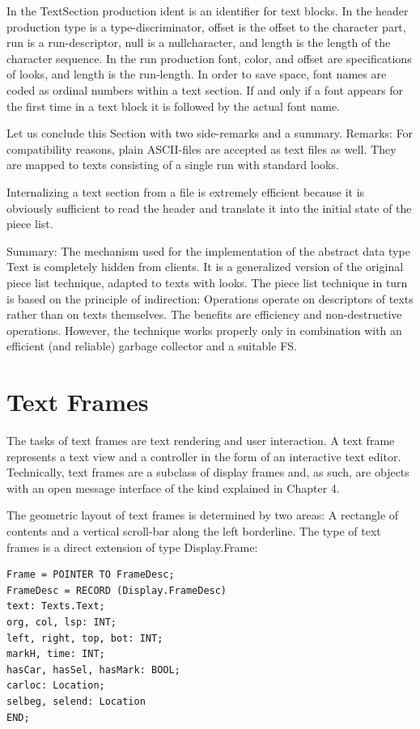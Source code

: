 In the TextSection production ident is an identifier for text blocks. In the header production type is a
type-discriminator, offset is the offset to the character part, run is a run-descriptor, null is a nullcharacter, and length is the length of the character sequence. In the run production font, color, and
offset are specifications of looks, and length is the run-length. In order to save space, font names
are coded as ordinal numbers within a text section. If and only if a font appears for the first time in a
text block it is followed by the actual font name.

Let us conclude this Section with two side-remarks and a summary.
Remarks:
For compatibility reasons, plain ASCII-files are accepted as text files as well. They are mapped
to texts consisting of a single run with standard looks.

Internalizing a text section from a file is extremely efficient because it is obviously sufficient to
read the header and translate it into the initial state of the piece list.

Summary: The mechanism used for the implementation of the abstract data type Text is completely
hidden from clients. It is a generalized version of the original piece list technique, adapted to texts
with looks. The piece list technique in turn is based on the principle of indirection: Operations
operate on descriptors of texts rather than on texts themselves. The benefits are efficiency and
non-destructive operations. However, the technique works properly only in combination with an
efficient (and reliable) garbage collector and a suitable FS.

\section{Text Frames}
The tasks of text frames are text rendering and user interaction. A text frame represents a text view
and a controller in the form of an interactive text editor. Technically, text frames are a subclass of
display frames and, as such, are objects with an open message interface of the kind explained in
Chapter 4.

The geometric layout of text frames is determined by two areas: A rectangle of contents and a
vertical scroll-bar along the left borderline. The type of text frames is a direct extension of type
Display.Frame:
\begin{verbatim}
Frame = POINTER TO FrameDesc;
FrameDesc = RECORD (Display.FrameDesc)
text: Texts.Text;
org, col, lsp: INT;
left, right, top, bot: INT;
markH, time: INT;
hasCar, hasSel, hasMark: BOOL;
carloc: Location;
selbeg, selend: Location
END;
\end{verbatim}

